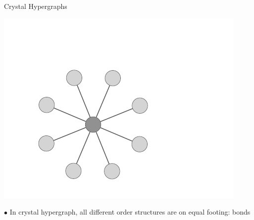 \documentclass[11pt]{beamer}
\begin{document}





\begin{frame}{Crystal Hypergraphs}


\begin{center}
\includegraphics[scale=0.7]{hypergraph.pdf}
\end{center}
\vspace{.5cm}

\medskip

$\bullet$ In crystal hypergraph, all different order structures are on equal footing: bonds

\end{frame}
\end{document}
